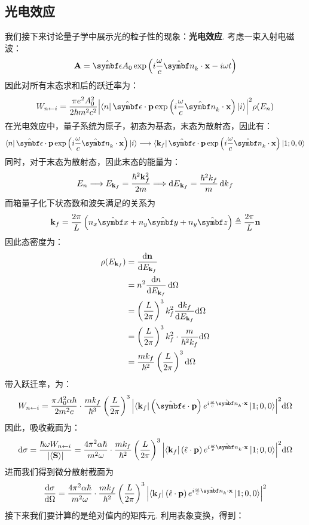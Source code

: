 \subsection{光电效应}
我们接下来讨论量子学中展示光的粒子性的现象：\textbf{光电效应}. 考虑一束入射电磁波：
\[
\vA = \uv{\epsilon}A_{0}\exp\br{i\frac{\omega}{c}\uv{n}_{k}\cdot\vr - i\omega t}
\]
因此对所有末态求和后的跃迁率为：
\[
W_{\jump{n}{i}} = \frac{\pi e^{2}A_{0}^{2}}{2\hh m^{2}c^{2}}\abs{\bra{n}\uv{\epsilon}\cdot\vp\exp\br{i\frac{\omega}{c}\uv{n}_{k}\cdot\vr}\ket{i}}^{2}\rho(E_{n})
\]
在光电效应中，量子系统为原子，初态为基态，末态为散射态，因此有：
\[
\bra{n}\uv{\epsilon}\cdot\vp\exp\br{i\frac{\omega}{c}\uv{n}_{k}\cdot\vr}\ket{i} \longrightarrow \bra{\vk_{f}}\uv{\epsilon}\cdot\vp\exp\br{i\frac{\omega}{c}\uv{n}_{k}\cdot\vr}\ket{1;0,0}
\]
同时，对于末态为散射态，因此末态的能量为：
\[
E_{n}\longrightarrow E_{\mathbf{k}_{f}} = \frac{\hbar^{2}\mathbf{k}_{f}^{2}}{2m}\Longrightarrow \dd{E}_{\mathbf{k}_{f}} = \frac{\hbar^{2}k_{f}}{m}\dd{k}_{f} 
\]
而箱量子化下状态数和波矢满足的关系为
\[
\vk_{f} = \frac{2\pi}{L}\br{n_{x}\uv{x} + n_{y}\uv{y} + n_{y}\uv{z}} \triangleq \frac{2\pi}{L}{\mathbf{n}}
\]
因此态密度为：
\begin{align*}
\rho(E_{\mathbf{k}_{f}})
& = \frac{\dd{\mathbf{n}}}{\dd{E_{\mathbf{k}_{f}}}} \\
& = n^{2}\frac{\dd{n}}{\dd{E_{\mathbf{k}_{f}}}}\dd{\Omega} \\
& = \left({\frac{L}{2\pi}}\right)^{3}k_{f}^{2}\frac{\dd{k_{f}}}{\dd{E_{\mathbf{k}_{f}}}}\dd\Omega \\
& = \left({\frac{L}{2\pi}}\right)^{3}k_{f}^{2}\cdot\frac{m}{\hbar^{2}k_{f}}\dd\Omega \\
& = \frac{mk_{f}}{\hbar^{2}}\left({\frac{L}{2\pi}}\right)^{3}\dd\Omega 
\end{align*}
带入跃迁率，为：
\[
W_{\jump{n}{i}} = \frac{\pi A_{0}^{2}\al\hh}{2m^{2}c}\cdot\frac{mk_{f}}{\hh^{3}}\br{\frac{L}{2\pi}}^{3}\abs{\bra{\vk_{f}}\br{\uv{\epsilon}\cdot\vp}e^{i\frac{\omega}{c}\uv{n}_{k}\cdot\vr}\ket{1;0,0}}^{2}\dd\Omega
\]
因此，吸收截面为：
\[
\dd\sigma = \frac{\hh\omega W_{\jump{n}{i}}}{\abs{\avg{\vS}}} = \frac{4\pi^{2}\al\hh}{m^{2}\omega}\cdot\frac{mk_{f}}{\hh^{2}}\br{\frac{L}{2\pi}}^{3}\abs{\bra{\vk_{f}}\br{\hat{\epsilon}\cdot\vp}e^{i\frac{\omega}{c}\uv{n}_{k}\cdot\vr}\ket{1;0,0}}^{2}\dd\Omega 
\]
进而我们得到微分散射截面为
\[
\dOmega{\sigma} = \frac{4\pi^{2}\al\hh}{m^{2}\omega}\cdot\frac{mk_{f}}{\hh^{2}}\br{\frac{L}{2\pi}}^{3}\abs{\bra{\vk_{f}}\br{\hat{\epsilon}\cdot\vp}e^{i\frac{\omega}{c}\uv{n}_{k}\cdot\vr}\ket{1;0,0}}^{2}
\]
接下来我们要计算的是绝对值内的矩阵元. 利用表象变换，得到：
